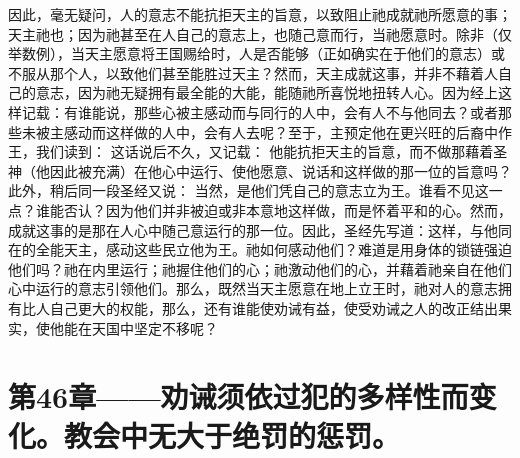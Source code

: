 因此，毫无疑问，人的意志不能抗拒天主的旨意，以致阻止祂成就祂所愿意的事；天主祂也；因为祂甚至在人自己的意志上，也随己意而行，当祂愿意时。除非（仅举数例），当天主愿意将王国赐给时，人是否能够（正如确实在于他们的意志）或不服从那个人，以致他们甚至能胜过天主？然而，天主成就这事，并非不藉着人自己的意志，因为祂无疑拥有最全能的大能，能随祂所喜悦地扭转人心。因为经上这样记载：有谁能说，那些心被主感动而与同行的人中，会有人不与他同去？或者那些未被主感动而这样做的人中，会有人去呢？至于，主预定他在更兴旺的后裔中作王，我们读到： 这话说后不久，又记载： 他能抗拒天主的旨意，而不做那藉着圣神（他因此被充满）在他心中运行、使他愿意、说话和这样做的那一位的旨意吗？此外，稍后同一段圣经又说： 当然，是他们凭自己的意志立为王。谁看不见这一点？谁能否认？因为他们并非被迫或非本意地这样做，而是怀着平和的心。然而，成就这事的是那在人心中随己意运行的那一位。因此，圣经先写道：这样，与他同在的全能天主，感动这些民立他为王。祂如何感动他们？难道是用身体的锁链强迫他们吗？祂在内里运行；祂握住他们的心；祂激动他们的心，并藉着祂亲自在他们心中运行的意志引领他们。那么，既然当天主愿意在地上立王时，祂对人的意志拥有比人自己更大的权能，那么，还有谁能使劝诫有益，使受劝诫之人的改正结出果实，使他能在天国中坚定不移呢？\par


\section{第46章——劝诫须依过犯的多样性而变化。教会中无大于绝罚的惩罚。}

